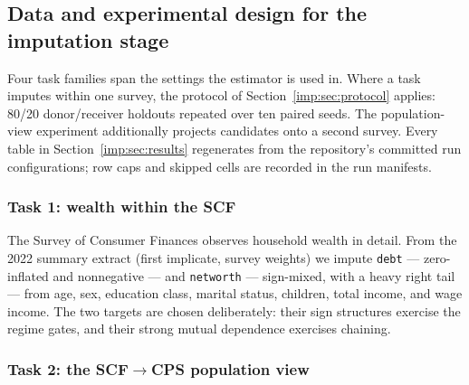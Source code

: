 \subsection{Data and experimental design for the imputation stage}
\label{imp:sec:data}

Four task families span the settings the estimator is used in. Where a task
imputes within one survey, the protocol of Section~\ref{imp:sec:protocol} applies:
80/20 donor/receiver holdouts repeated over ten paired seeds. The
population-view experiment additionally projects candidates onto a second
survey. Every table in Section~\ref{imp:sec:results} regenerates from the
repository's committed run configurations; row caps and skipped cells are
recorded in the run manifests.

\subsubsection{Task 1: wealth within the SCF}
\label{imp:sec:task-scf}

The Survey of Consumer Finances \citep{fed2023scf} observes household wealth
in detail. From the 2022 summary extract (first implicate, survey weights) we
impute \texttt{debt} --- zero-inflated and nonnegative --- and
\texttt{networth} --- sign-mixed, with a heavy right tail --- from age, sex,
education class, marital status, children, total income, and wage income.
The two targets are chosen deliberately: their sign structures exercise the
regime gates, and their strong mutual dependence exercises chaining.

\subsubsection{Task 2: the SCF\texorpdfstring{$\to$}{->}CPS population view}
\label{imp:sec:task-harness}

